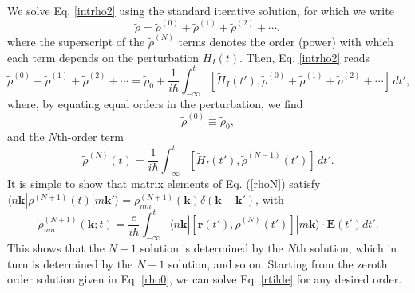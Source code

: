 We solve Eq. \eqref{intrho2} using the standard iterative
solution, for which we write
\begin{equation}\label{rhop}
\tilde{\rho}
= \tilde{\rho}^{(0)}
+ \tilde{\rho}^{(1)}
+ \tilde{\rho}^{(2)}
+ \cdots,
\end{equation}
where the superscript of the $\tilde{\rho}^{(N)}$ terms denotes the order
(power) with which each term depends on the perturbation $H_{I}(t)$. Then, Eq.
\eqref{intrho2} reads
\begin{equation}\label{intrho3}
  \tilde{\rho}^{(0)} 
+ \tilde{\rho}^{(1)} 
+ \tilde{\rho}^{(2)} 
+ \cdots
= \tilde{\rho}_{0}
+ \frac{1}{i\hbar}\int_{-\infty}^{t} 
  \left[
  \tilde{H}_{I}(t'),\tilde{\rho}^{(0)}+\tilde{\rho}^{(1)}+\tilde{\rho}^{(2)}
  + \cdots
  \right]\,dt',
\end{equation}
where, by equating equal orders in the perturbation, we find
\begin{equation}\label{rho0}
\tilde{\rho}^{(0)}\equiv\tilde{\rho}_{0},
\end{equation}
and the $N$th-order term
\begin{equation}\label{rhoN}
\tilde{\rho}^{(N)}(t)=
\frac{1}{i\hbar}
\int_{-\infty}^{t}
\left[\tilde{H}_{I}(t'),\tilde{\rho}^{(N-1)}(t')\right]\,dt'.
\end{equation}
It is simple to show that matrix elements of Eq. (\ref{rhoN}) satisfy 
$\langle n\mathbf{k}| \rho^{(N+1)}(t) |m\mathbf{k}'\rangle =
\rho^{(N+1)}_{nm}(\mathbf{k})\delta(\mathbf{k}-\mathbf{k}')$, with
\begin{equation}\label{rtilde}
\tilde{\rho}^{(N+1)}_{nm}(\mathbf{k};t)
= \frac{e}{i\hbar}\int_{-\infty}^t
\langle n\mathbf{k}|
\left[\mathbf{r}(t'),\tilde{\rho}^{(N)}(t')\right]
|m\mathbf{k}\rangle
\cdot\mathbf{E}(t')dt'.
\end{equation}
This shows that the $N + 1$ solution is determined by the $N$th solution, which
in turn is determined by the $N - 1$ solution, and so on. Starting from the
zeroth order solution given in Eq. \eqref{rho0}, we can solve Eq. \eqref{rtilde}
for any desired order.

